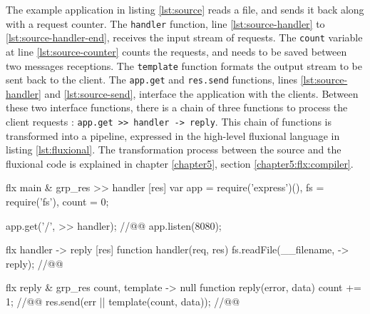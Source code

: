 
The example application in listing \ref{lst:source} reads a file, and sends it back along with a request counter.
The \texttt{handler} function, line \ref{lst:source-handler} to \ref{lst:source-handler-end}, receives the input stream of requests.
The \texttt{count} variable at line \ref{lst:source-counter} counts the requests, and needs to be saved between two messages receptions.
The \texttt{template} function formats the output stream to be sent back to the client.
The \texttt{app.get} and \texttt{res.send} functions, lines \ref{lst:source-handler} and \ref{lst:source-send}, interface the application with the clients.
Between these two interface functions, there is a chain of three functions to process the client requests : \texttt{app.get {>}> handler -> reply}.
This chain of functions is transformed into a pipeline, expressed in the high-level fluxional language in listing \ref{lst:fluxional}.
The transformation process between the source and the fluxional code is explained in chapter \ref{chapter5}, section \ref{chapter5:flx:compiler}.

\begin{code}[flx, caption={Example application expressed in the high-level fluxional language}, label={lst:fluxional}]
flx main & grp_res
>> handler [res]
  var app = require('express')(),
      fs = require('fs'),
      count = 0;

  app.get('/', >> handler); //@\label{lst:fluxional-streamtohandler}@
  app.listen(8080);

flx handler
-> reply [res]
  function handler(req, res) {
    fs.readFile(__filename, -> reply); //@\label{lst:fluxional-readfile}@
  }

flx reply & grp_res {count, template}
-> null
  function reply(error, data) {
    count += 1; //@\label{lst:fluxional-counter}@
    res.send(err || template(count, data)); //@\label{lst:fluxional-ressend}@
  }
\end{code}

